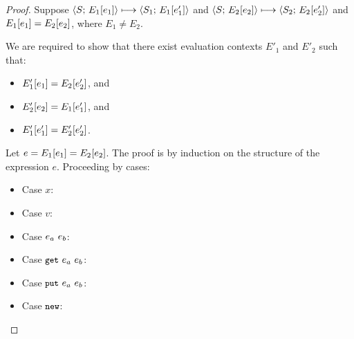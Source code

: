 \begin{proof}
  Suppose $\langle S;\, E_1\hspace{-0.5mm}\left[e_1\right] \rangle \longmapsto \langle S_1;\, E_1\hspace{-0.5mm}\left[e'_1\right] \rangle$ and
  $\langle S;\, E_2\hspace{-0.5mm}\left[e_2\right] \rangle \longmapsto
  \langle S_2;\, E_2\hspace{-0.5mm}\left[e'_2\right] \rangle$ and $E_1\hspace{-0.5mm}\left[e_1\right] =
  E_2\hspace{-0.5mm}\left[e_2\right]$, where $E_1 \neq E_2$.

  We are required to show that there exist evaluation contexts $E'_1$
  and $E'_2$ such that:
  \begin{itemize}
  \item $E'_1\hspace{-0.5mm}\left[e_1\right] = E_2\hspace{-0.5mm}\left[e'_2\right]$, and
  \item $E'_2\hspace{-0.5mm}\left[e_2\right] = E_1\hspace{-0.5mm}\left[e'_1\right]$, and
  \item $E'_1\hspace{-0.5mm}\left[e'_1\right] = E'_2\hspace{-0.5mm}\left[e'_2\right]$.
  \end{itemize}

  Let $e = E_1\hspace{-0.5mm}\left[e_1\right] = E_2\hspace{-0.5mm}\left[e_2\right]$.  The proof is
  by induction on the structure of the expression $e$.  Proceeding by
  cases:

  \begin{itemize}

    \item Case $x$: \TODO{}

    \item Case $v$: \TODO{}

    \item Case $e_a~e_b$: \TODO{}

    \item Case $\mbox{\small{\texttt{get}}}~e_a~e_b$: \TODO{}

    \item Case $\mbox{\small{\texttt{put}}}~e_a~e_b$: \TODO{}

    \item Case $\mbox{\small{\texttt{new}}}$: \TODO{}
  \end{itemize}
\end{proof}
